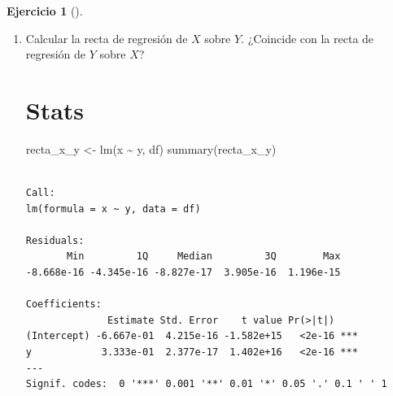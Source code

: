 \documentclass[
  a4paper,
]{scrreport}
\newenvironment{Shaded}{\begin{snugshade}}{\end{snugshade}}
\newcommand{\ExtensionTok}[1]{\textcolor[rgb]{0.00,0.23,0.31}{#1}}
\newcommand{\FunctionTok}[1]{\textcolor[rgb]{0.28,0.35,0.67}{#1}}
\newcommand{\NormalTok}[1]{\textcolor[rgb]{0.00,0.23,0.31}{#1}}
\newcommand{\OtherTok}[1]{\textcolor[rgb]{0.00,0.23,0.31}{#1}}
\newcommand{\SpecialCharTok}[1]{\textcolor[rgb]{0.37,0.37,0.37}{#1}}
\theoremstyle{definition}
\newtheorem{exercise}{Ejercicio}[chapter]
\theoremstyle{remark}
\begin{document}
\begin{exercise}[]
\begin{enumerate}
\begin{tcolorbox}
  \section{Copilot}

\begin{Shaded}
\begin{Highlighting}[]
\ExtensionTok{Calcular}\NormalTok{ el coeficiente de determinación lineal R² del modelo de regresión lineal ajustado.}
\end{Highlighting}
\end{Shaded}

  Como el coeficiente de determinación lineal vale 1, el ajuste de la
  recta de regresión es perfecto.

  \end{tcolorbox}
\item
  Calcular la recta de regresión de \(X\) sobre \(Y\). ¿Coincide con la
  recta de regresión de \(Y\) sobre \(X\)?

  \begin{tcolorbox}[enhanced jigsaw, colframe=quarto-callout-tip-color-frame, toprule=.15mm, bottomtitle=1mm, breakable, opacitybacktitle=0.6, toptitle=1mm, colback=white, bottomrule=.15mm, title=\textcolor{quarto-callout-tip-color}{\faLightbulb}\hspace{0.5em}{Solución}, arc=.35mm, left=2mm, titlerule=0mm, rightrule=.15mm, coltitle=black, leftrule=.75mm, opacityback=0, colbacktitle=quarto-callout-tip-color!10!white]

  \section{Stats}

\begin{Shaded}
\begin{Highlighting}[]
\NormalTok{recta\_x\_y }\OtherTok{\textless{}{-}} \FunctionTok{lm}\NormalTok{(x }\SpecialCharTok{\textasciitilde{}}\NormalTok{ y, df) }
\FunctionTok{summary}\NormalTok{(recta\_x\_y)}
\end{Highlighting}
\end{Shaded}

\begin{verbatim}

Call:
lm(formula = x ~ y, data = df)

Residuals:
       Min         1Q     Median         3Q        Max 
-8.668e-16 -4.345e-16 -8.827e-17  3.905e-16  1.196e-15 

Coefficients:
              Estimate Std. Error    t value Pr(>|t|)    
(Intercept) -6.667e-01  4.215e-16 -1.582e+15   <2e-16 ***
y            3.333e-01  2.377e-17  1.402e+16   <2e-16 ***
---
Signif. codes:  0 '***' 0.001 '**' 0.01 '*' 0.05 '.' 0.1 ' ' 1


\end{verbatim}
\end{tcolorbox}
\end{enumerate}
\end{exercise}
\end{document}
